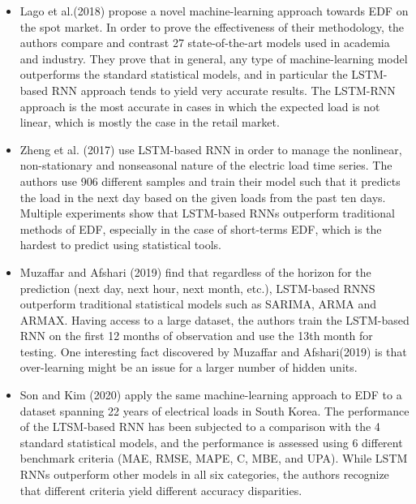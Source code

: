 \documentclass[10pt,twocolumn,letterpaper]{article}
\begin{document}
\begin{itemize}

\item Lago et al.(2018) propose a novel machine-learning
approach towards EDF on the spot market. In order to prove the effectiveness of their methodology, the authors compare and contrast 27 state-of-the-art models used in academia and industry. They prove that in general, any type of machine-learning model outperforms the standard statistical models, and in particular the LSTM-based RNN approach tends to yield very accurate results. The LSTM-RNN approach is the most accurate in cases in which the expected load is not linear, which is mostly the case in the retail market.

\item  Zheng et al. (2017) use LSTM-based RNN in order to manage the nonlinear, non-stationary and nonseasonal nature of the electric load time series. The authors use 906 different samples and train their model such that it predicts the load in the next day based on the given loads from the past ten days. Multiple experiments show that LSTM-based RNNs outperform traditional methods of EDF, especially in the case of short-terms EDF, which is the hardest to predict using statistical tools.

\item Muzaffar and Afshari (2019) find that regardless of the
horizon for the prediction (next day, next hour, next month, etc.), LSTM-based RNNS outperform traditional statistical models such as SARIMA, ARMA and ARMAX. Having access to a large dataset, the authors train the LSTM-based RNN on the first 12 months of
observation and use the 13th month for testing. One interesting fact discovered by Muzaffar and Afshari(2019) is that over-learning might be an issue for a larger number of hidden units.

\item Son and Kim (2020) apply the same machine-learning
approach to EDF to a dataset spanning 22 years of electrical loads in South Korea. The performance of the LTSM-based RNN has been subjected to a comparison with the 4 standard statistical models, and the performance is assessed using 6 different benchmark criteria (MAE, RMSE, MAPE, C, MBE, and UPA).
While LSTM RNNs outperform other models in all six categories, the authors recognize that different criteria yield different accuracy disparities.


\end{itemize}
\end{document}
